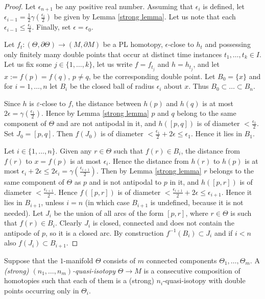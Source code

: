 \documentclass[a4paper,12pt,reqno,oneside]{amsart} %
\theoremstyle{plain}
\theoremstyle{definition}
\theoremstyle{named}
\def\eps{\varepsilon}
\renewcommand{\:}{\colon}
\begin{document}
\begin{proof}
Let $\epsilon_{n+1}$ be any positive real number.
Assuming that $\epsilon_i$ is defined, let $\epsilon_{i-1}=\frac12\gamma(\frac{\epsilon_i}2)$ be given by Lemma \ref{strong lemma}.
Let us note that each $\epsilon_{i-1}\le\frac{\epsilon_i}4$.
Finally, set $\epsilon=\epsilon_0$.

Let $f_t\:(\Theta,\partial\Theta)\to (M,\partial M)$ be a PL homotopy, $\epsilon$-close to $h_t$ and possessing only finitely many double points 
that occur at distinct time instances $t_1,\dots,t_k\in I$.
Let us fix some $j\in\{1,\dots,k\}$, let us write $f=f_{t_j}$ and $h=h_{t_j}$, and let $x:=f(p)=f(q)$, $p\ne q$, be 
the corresponding double point.
Let $B_0=\{x\}$ and for $i=1,\dots,n$ let $B_i$ be the closed ball of radius $\epsilon_i$ about $x$.
Thus $B_0\subset\dots\subset B_n$.

Since $h$ is $\eps$-close to $f$, the distance between $h(p)$ and $h(q)$ is at most $2\epsilon=\gamma(\frac{\epsilon_1}2)$.
Hence by Lemma \ref{strong lemma} $p$ and $q$ belong to the same component of $\Theta$ and are not antipodal in it, 
and $h([p,q])$ is of diameter $<\frac{\epsilon_1}2$.
Set $J_0=[p,q]$.
Then $f(J_0)$ is of diameter $<\frac{\epsilon_1}2+2\epsilon\le\epsilon_1$.
Hence it lies in $B_1$.

Let $i\in\{1,\dots,n\}$.
Given any $r\in\Theta$ such that $f(r)\in B_i$, the distance from $f(r)$ to $x=f(p)$ is at most $\epsilon_i$.
Hence the distance from $h(r)$ to $h(p)$ is at most $\epsilon_i+2\epsilon\le 2\epsilon_i=\gamma(\frac{\epsilon_{i+1}}2)$.
Then by Lemma \ref{strong lemma} $r$ belongs to the same component of $\Theta$ as $p$ and is not antipodal to $p$ in it, and $h([p,r])$ 
is of diameter $<\frac{\epsilon_{i+1}}2$.
Hence $f([p,r])$ is of diameter $<\frac{\epsilon_{i+1}}2+2\epsilon\le\epsilon_{i+1}$.
Hence it lies in $B_{i+1}$, unless $i=n$ (in which case $B_{i+1}$ is undefined, because it is not needed).
Let $J_i$ be the union of all arcs of the form $[p,r]$, where $r\in\Theta$ is such that $f(r)\in B_i$.
Clearly $J_i$ is closed, connected and does not contain the antipode of $p$, so it is a closed arc.
By construction $f^{-1}(B_i)\subset J_i$ and if $i<n$ also $f(J_i)\subset B_{i+1}$.
\end{proof}

Suppose that the $1$-manifold $\Theta$ consists of $m$ connected components $\Theta_1,\dots,\Theta_m$.
A {\it (strong) $(n_1,\dots,n_m)$-quasi-isotopy} $\Theta\to M$ is a consecutive composition of homotopies 
such that each of them is a (strong) $n_i$-quasi-isotopy with double points occurring only in $\Theta_i$.
\end{document}
